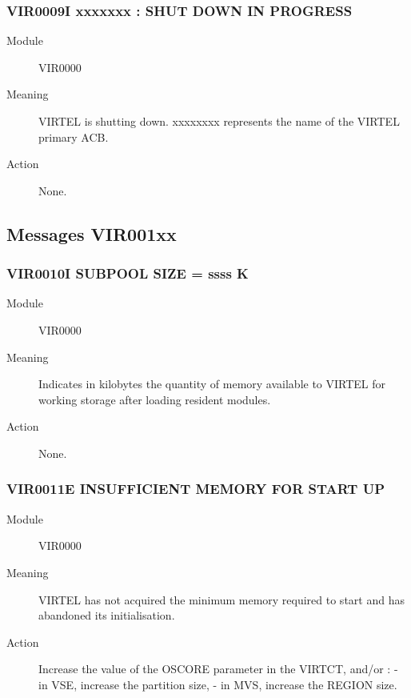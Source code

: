 \documentclass[letterpaper,10pt,english]{sphinxmanual}
\begin{document}
\subsubsection{VIR0009I xxxxxxx : SHUT DOWN IN PROGRESS}
\label{\detokenize{messages:vir0009i-xxxxxxx-shut-down-in-progress}}\begin{description}
\item[{Module}] \leavevmode
VIR0000

\item[{Meaning}] \leavevmode
VIRTEL is shutting down. xxxxxxxx represents the name of the VIRTEL primary ACB.

\item[{Action}] \leavevmode
None.

\end{description}


\subsection{Messages VIR001xx}
\label{\detokenize{messages:messages-vir001xx}}

\subsubsection{VIR0010I SUBPOOL SIZE = ssss K}
\label{\detokenize{messages:vir0010i-subpool-size-ssss-k}}\begin{description}
\item[{Module}] \leavevmode
VIR0000

\item[{Meaning}] \leavevmode
Indicates in kilobytes the quantity of memory available to VIRTEL for working storage after loading resident modules.

\item[{Action}] \leavevmode
None.

\end{description}


\subsubsection{VIR0011E INSUFFICIENT MEMORY FOR START UP}
\label{\detokenize{messages:vir0011e-insufficient-memory-for-start-up}}\begin{description}
\item[{Module}] \leavevmode
VIR0000

\item[{Meaning}] \leavevmode
VIRTEL has not acquired the minimum memory required to start and has abandoned its initialisation.

\item[{Action}] \leavevmode
Increase the value of the OSCORE parameter in the VIRTCT, and/or :
- in VSE, increase the partition size,
- in MVS, increase the REGION size.

\end{description}
\end{document}
